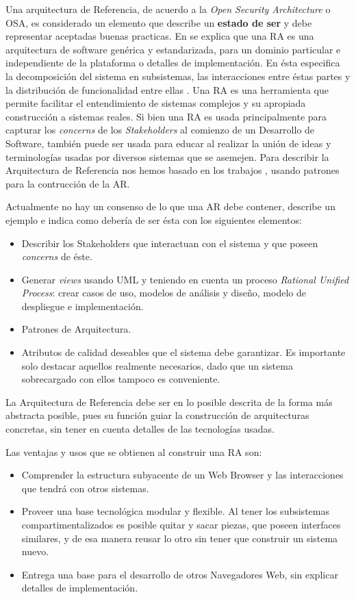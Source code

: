 Una arquitectura de Referencia, de acuerdo a la \textit{Open Security Architecture} o OSA\cite{openSecArch}, es considerado un elemento que describe un \textbf{estado de ser} y debe representar aceptadas buenas practicas. En \cite{Avgeriou2003} se explica que una RA es una arquitectura de software genérica y estandarizada, para un dominio particular e independiente de la plataforma o detalles de implementación. En ésta especifica la decomposición del sistema en subsistemas, las interacciones entre éstas partes y la distribución de funcionalidad entre ellas \cite{Bass2012}. Una RA es una herramienta que permite facilitar el entendimiento de sistemas complejos y su apropiada construcción a sistemas reales. Si bien una RA es usada principalmente para capturar los \textit{concerns} de los \textit{Stakeholders} al comienzo de un Desarrollo de Software, también puede ser usada para educar al realizar la unión de ideas y terminologías usadas por diversos sistemas que se asemejen. Para describir la Arquitectura de Referencia nos hemos basado en los trabajos \cite{Avgeriou2003,Hashizume2014Reference, Submitted2014}, usando patrones para la contrucción de la AR.

Actualmente no hay un consenso de lo que una AR debe contener, \cite{Avgeriou2003} describe un ejemplo e indica como debería de ser ésta con los siguientes elementos:
\begin{itemize}
    \item Describir los Stakeholders que interactuan con el sistema y que poseen \textit{concerns} de éste.
    \item Generar \textit{views} usando UML y teniendo en cuenta un proceso \textit{Rational Unified Process}: crear casos de uso, modelos de análisis y diseño, modelo de despliegue e implementación.
    \item Patrones de Arquitectura.
    \item Atributos de calidad deseables que el sistema debe garantizar. Es importante solo destacar aquellos realmente necesarios, dado que un sistema sobrecargado con ellos tampoco es conveniente.
\end{itemize}

La Arquitectura de Referencia debe ser en lo posible descrita de la forma más abstracta posible, pues su función guiar la construcción de arquitecturas concretas, sin tener en cuenta detalles de las tecnologías usadas.

Las ventajas y usos que se obtienen al construir una RA son:
\begin{itemize}
    \item Comprender la estructura subyacente de un Web Browser y las interacciones que tendrá con otros sistemas.
    \item Proveer una base tecnológica modular y flexible. Al tener los subsistemas compartimentalizados es posible quitar y sacar piezas, que poseen interfaces similares, y de esa manera reusar lo otro sin tener que construir un sistema nuevo.
    \item Entrega una base para el desarrollo de otros Navegadores Web, sin explicar detalles de implementación.
\end{itemize}

